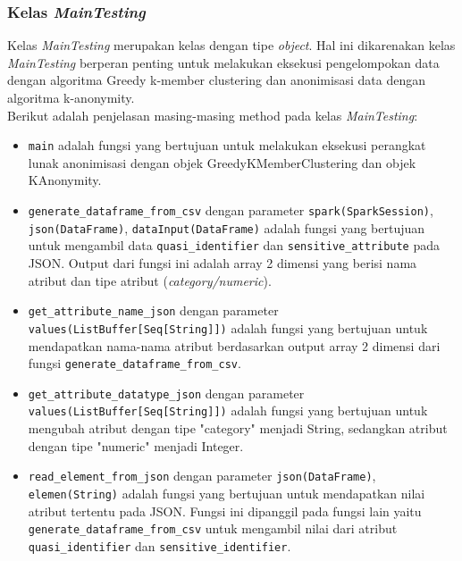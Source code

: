 \subsubsection{Kelas \textit{MainTesting}}
Kelas \textit{MainTesting} merupakan kelas dengan tipe \textit{object}. Hal ini dikarenakan kelas \textit{MainTesting} berperan penting untuk melakukan eksekusi  pengelompokan data dengan algoritma Greedy k-member clustering dan anonimisasi data dengan algoritma k-anonymity. \\

\noindent Berikut adalah penjelasan masing-masing method pada kelas \textit{MainTesting}:

\begin{itemize}

\item \texttt{main} adalah fungsi yang bertujuan untuk melakukan eksekusi perangkat lunak anonimisasi dengan objek GreedyKMemberClustering dan objek KAnonymity.

\item \texttt{generate\_dataframe\_from\_csv} dengan parameter \texttt{spark(SparkSession)}, \texttt{json(DataFrame)}, \texttt{dataInput(DataFrame)} adalah fungsi yang bertujuan untuk mengambil data \texttt{quasi\_identifier} dan \texttt{sensitive\_attribute} pada JSON. Output dari fungsi ini adalah array 2 dimensi yang berisi nama atribut dan tipe atribut (\textit{category/numeric}).

\item \texttt{get\_attribute\_name\_json} dengan parameter \texttt{values(ListBuffer[Seq[String]])} adalah fungsi yang bertujuan untuk mendapatkan nama-nama atribut berdasarkan output array 2 dimensi dari fungsi \texttt{generate\_dataframe\_from\_csv}.

\item \texttt{get\_attribute\_datatype\_json} dengan parameter \texttt{values(ListBuffer[Seq[String]])} adalah fungsi yang bertujuan untuk mengubah atribut dengan tipe "category" menjadi String, sedangkan atribut dengan tipe "numeric" menjadi Integer. 

\item \texttt{read\_element\_from\_json} dengan parameter \texttt{json(DataFrame)}, \texttt{elemen(String)} adalah fungsi yang bertujuan untuk mendapatkan nilai atribut tertentu pada JSON. Fungsi ini dipanggil pada fungsi lain yaitu \texttt{generate\_dataframe\_from\_csv} untuk mengambil nilai dari atribut \texttt{quasi\_identifier} dan \texttt{sensitive\_identifier}.

\end{itemize}

